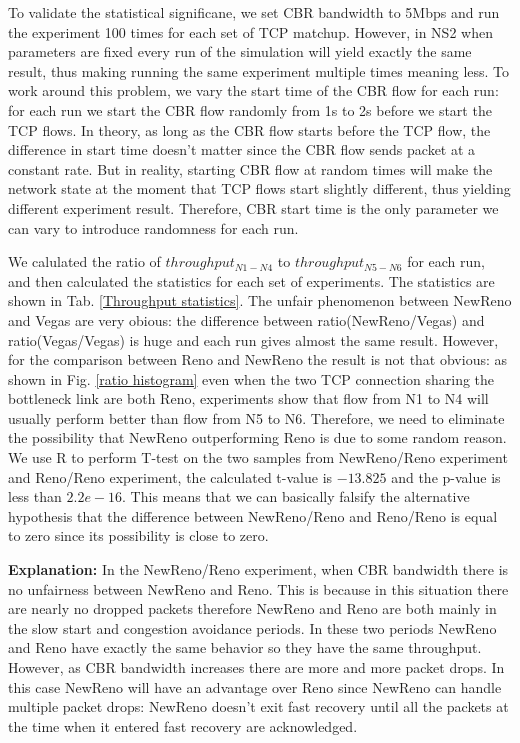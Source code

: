 \documentclass[USenglish,oneside,twocolumn]{article}
\begin{document}
To validate the statistical significane, we set CBR bandwidth to 5Mbps and run the experiment 100 times for each set of TCP matchup. However, in NS2 when parameters are fixed every run of the simulation will yield exactly the same result, thus making running the same experiment multiple times meaning less. To work around this problem, we vary the start time of the CBR flow for each run: for each run we start the CBR flow randomly from 1s to 2s before we start the TCP flows. In theory, as long as the CBR flow starts before the TCP flow, the difference in start time doesn't matter since the CBR flow sends packet at a constant rate. But in reality, starting CBR flow at random times will make the network state at the moment that TCP flows start slightly different, thus yielding different experiment result. Therefore, CBR start time is the only parameter we can vary to introduce randomness for each run.

We calulated the ratio of \(throughput_{N1-N4}\) to \(throughput_{N5-N6}\) for each run, and then calculated the statistics for each set of experiments. The statistics are shown in Tab. \ref{Throughput statistics}. The unfair phenomenon between NewReno and Vegas are very obious: the difference between ratio(NewReno/Vegas) and ratio(Vegas/Vegas) is huge and each run gives almost the same result. However, for the comparison between Reno and NewReno the result is not that obvious: as shown in Fig. \ref{ratio histogram} even when the two TCP connection sharing the bottleneck link are both Reno, experiments show that flow from N1 to N4 will usually perform better than flow from N5 to N6. Therefore, we need to eliminate the possibility that NewReno outperforming Reno is due to some random reason. We use R to perform T-test on the two samples from NewReno/Reno experiment and Reno/Reno experiment, the calculated t-value is \(-13.825\) and the p-value is less than \(2.2e-16\). This means that we can basically falsify the alternative hypothesis that the difference between NewReno/Reno and Reno/Reno is equal to zero since its possibility is close to zero.

\noindent \textbf{Explanation:} In the NewReno/Reno experiment, when CBR bandwidth there is no unfairness between NewReno and Reno. This is because in this situation there are nearly no dropped packets therefore NewReno and Reno are both mainly in the slow start and congestion avoidance periods. In these two periods NewReno and Reno have exactly the same behavior so they have the same throughput. However, as CBR bandwidth increases there are more and more packet drops. In this case NewReno will have an advantage over Reno since NewReno can handle multiple packet drops: NewReno doesn't exit fast recovery until all the packets at the time when it entered fast recovery are acknowledged.
\end{document}
